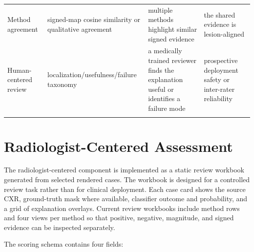 \begin{longtable}[]{@{}llll@{}}
\begin{minipage}[t]{0.22\columnwidth}
		Method agreement\strut
	\end{minipage} & \begin{minipage}[t]{0.22\columnwidth}\raggedright
		signed-map cosine similarity or qualitative agreement\strut
	\end{minipage} & \begin{minipage}[t]{0.22\columnwidth}\raggedright
		multiple methods highlight similar signed evidence\strut
	\end{minipage} & \begin{minipage}[t]{0.22\columnwidth}\raggedright
		the shared evidence is lesion-aligned\strut
	\end{minipage}\tabularnewline
	\begin{minipage}[t]{0.22\columnwidth}\raggedright
		Human-centered review\strut
	\end{minipage} & \begin{minipage}[t]{0.22\columnwidth}\raggedright
		localization/usefulness/failure taxonomy\strut
	\end{minipage} & \begin{minipage}[t]{0.22\columnwidth}\raggedright
		a medically trained reviewer finds the explanation useful or identifies
		a failure mode\strut
	\end{minipage} & \begin{minipage}[t]{0.22\columnwidth}\raggedright
		prospective deployment safety or inter-rater reliability\strut
	\end{minipage}\tabularnewline
	\bottomrule
	\label{table:3-3}
\end{longtable}

\hypertarget{radiologist-centered-assessment}{%
	\section{Radiologist-Centered
		Assessment}\label{radiologist-centered-assessment}}

The radiologist-centered component is implemented as a static review
workbook generated from selected rendered cases. The workbook is
designed for a controlled review task rather than for
clinical deployment. Each case card shows the source CXR, ground-truth
mask where available, classifier outcome and probability, and a grid of
explanation overlays. Current review workbooks include method rows and
four views per method so that positive, negative, magnitude, and signed
evidence can be inspected separately.

The scoring schema contains four fields:

